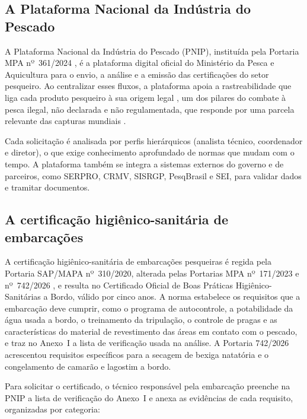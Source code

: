 \subsection{A Plataforma Nacional da Indústria do Pescado}

A Plataforma Nacional da Indústria do Pescado (PNIP), instituída pela Portaria MPA nº~361/2024 \cite{MPA2024}, é a plataforma digital oficial do Ministério da Pesca e Aquicultura para o envio, a análise e a emissão das certificações do setor pesqueiro.
Ao centralizar esses fluxos, a plataforma apoia a rastreabilidade que liga cada produto pesqueiro à sua origem legal \cite{Olsen2018}, um dos pilares do combate à pesca ilegal, não declarada e não regulamentada, que responde por uma parcela relevante das capturas mundiais \cite{Agnew2009}.

Cada solicitação é analisada por perfis hierárquicos (analista técnico, coordenador e diretor), o que exige conhecimento aprofundado de normas que mudam com o tempo. A plataforma também se integra a sistemas externos do governo e de parceiros, como SERPRO, CRMV, SISRGP, PesqBrasil e SEI, para validar dados e tramitar documentos.

\subsection{A certificação higiênico-sanitária de embarcações}

A certificação higiênico-sanitária de embarcações pesqueiras é regida pela Portaria SAP/MAPA nº~310/2020, alterada pelas Portarias MPA nº~171/2023 e nº~742/2026 \cite{Portaria310,Portaria171,Portaria742}, e resulta no Certificado Oficial de Boas Práticas Higiênico-Sanitárias a Bordo, válido por cinco anos. A norma estabelece os requisitos que a embarcação deve cumprir, como o programa de autocontrole, a potabilidade da água usada a bordo, o treinamento da tripulação, o controle de pragas e as características do material de revestimento das áreas em contato com o pescado, e traz no Anexo~I a lista de verificação usada na análise. A Portaria 742/2026 acrescentou requisitos específicos para a secagem de bexiga natatória e o congelamento de camarão e lagostim a bordo.

Para solicitar o certificado, o técnico responsável pela embarcação preenche na PNIP a lista de verificação do Anexo~I e anexa as evidências de cada requisito, organizadas por categoria:

